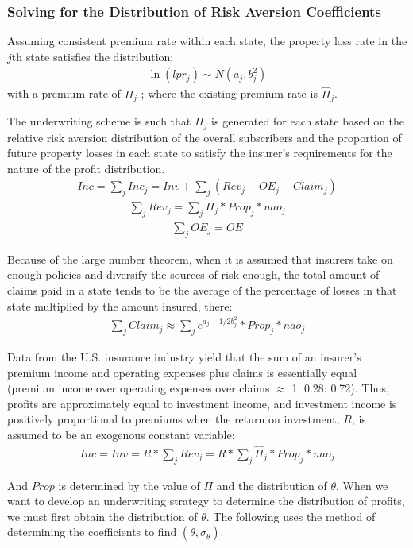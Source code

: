 \documentclass[12pt]{article}  %
\begin{document}
\subsubsection{Solving for the Distribution of Risk Aversion Coefficients}
Assuming consistent premium rate within each state, the property loss rate in the $j$th state satisfies the distribution:
\begin{align*}
    \ln (lpr_j) \sim N(a_j,b_j^2)
\end{align*}
with a premium rate of $\Pi_j$ ; where the existing premium rate is $\widehat{\Pi}_j$.

The underwriting scheme is such that $\Pi_j$ is generated for each state based on the relative risk aversion distribution of the overall subscribers and the proportion of future property losses in each state to satisfy the insurer's requirements for the nature of the profit distribution.
\begin{align*}
    Inc= \sum\limits_j Inc_j=Inv+\sum\limits_j (Rev_j-OE_j-Claim_j)
\end{align*}
\begin{align*}
    \sum\limits_j Rev_j=\sum\limits_j \Pi_j*Prop_j*nao_j
\end{align*}
\begin{align*}
    \sum\limits_j OE_j=OE
\end{align*}

Because of the large number theorem, when it is assumed that insurers take on enough policies and diversify the sources of risk enough, the total amount of claims paid in a state tends to be the average of the percentage of losses in that state multiplied by the amount insured, there:
\begin{align*}
    \sum\limits_jClaim_j\approx \sum\limits_j e^{a_j+1/2b_j^2}*Prop_j*nao_j
\end{align*}

Data from the U.S. insurance industry yield that the sum of an insurer's premium income and operating expenses plus claims is essentially equal (premium income over operating expenses over claims $\approx$ 1: 0.28: 0.72). Thus, profits are approximately equal to investment income, and investment income is positively proportional to premiums when the return on investment, $R$, is assumed to be an exogenous constant variable:
\begin{align*}
    Inc=Inv=R* \sum\limits_j Rev_j=R*\sum\limits_j \widehat\Pi_j*Prop_j*nao_j
\end{align*}

And $Prop$ is determined by the value of $\Pi$ and the distribution of $\theta$. When we want to develop an underwriting strategy to determine the distribution of profits, we must first obtain the distribution of $\theta$. The following uses the method of determining the coefficients to find $(\overline{\theta},\sigma_{\theta})$.
\end{document}
